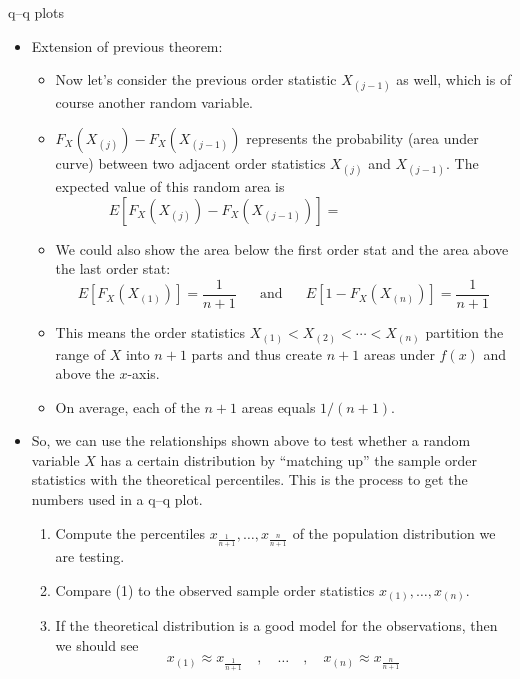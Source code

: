 \documentclass{article}
\newcommand{\order}[2]{#1_{(#2)}}		%
\begin{document}
q--q plots\bigskip
\begin{itemize}
    \item Extension of previous theorem:
    \begin{itemize}
        \item Now let's consider the previous order statistic $\order{X}{j-1}$ as well, which is of course another random variable.
        \item[] $F_X(\order{X}{j}) - F_X(\order{X}{j-1})$ represents the probability (area under curve) between two adjacent order statistics $\order{X}{j}$ and $\order{X}{j-1}$.  The expected value of this random area is
        \[E[F_X(\order{X}{j}) - F_X(\order{X}{j-1})] = \hspace{100pt}\]
        \item We could also show the area below the first order stat and the area above the last order stat:
        \[E[F_X(\order{X}{1})] = \frac{1}{n+1} \hspace{20pt} \text{and} \hspace{20pt}E[1 - F_X(\order{X}{n})] = \frac{1}{n+1}\]\vspace{20pt}
        \item This means the order statistics $\order{X}{1} < \order{X}{2} < \cdots < \order{X}{n}$ partition the range of $X$ into $n+1$ parts and thus create $n+1$ areas under $f(x)$ and above the $x$-axis.
        \item[] On average, each of the $n+1$ areas equals $1 / (n + 1)$.\vspace{150pt}
    \end{itemize}
    \item So, we can use the relationships shown above to test whether a random variable $X$ has a certain distribution by ``matching up'' the sample order statistics with the theoretical percentiles. This is the process to get the numbers used in a q--q plot.
    \begin{enumerate}[(1)]
        \item Compute the percentiles $x_{\frac{1}{n+1}}, \ldots, x_{\frac{n}{n+1}}$ of the population distribution we are testing.
        \item Compare (1) to the observed sample order statistics $\order{x}{1}, \ldots, \order{x}{n}$.
        \item[] If the theoretical distribution is a good model for the observations, then we should see
        \[\order{x}{1} \approx x_{\frac{1}{n+1}} \quad , \quad \ldots \quad, \quad \order{x}{n} \approx x_{\frac{n}{n+1}}\]

\end{enumerate}
\end{itemize}
\end{document}
